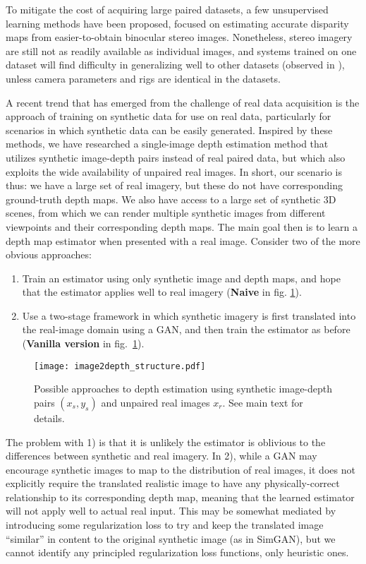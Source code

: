 \documentclass[runningheads]{llncs}
\begin{document}
To mitigate the cost of acquiring large paired datasets, a few unsupervised learning methods \cite{garg2016unsupervised,godard2017unsupervised,kuznietsov2017semi} have been proposed, focused on estimating accurate disparity maps from easier-to-obtain binocular stereo images. Nonetheless, stereo imagery are still not as readily available as individual images, and systems trained on one dataset will find difficulty in generalizing well to other datasets (observed in \cite{godard2017unsupervised}), unless camera parameters and rigs are identical in the datasets.

A recent trend that has emerged from the challenge of real data acquisition is the approach of training on synthetic data for use on real data\cite{qiu2016unrealcv,shrivastava2017learning,hoffman2017cycada}, particularly for scenarios in which synthetic data can be easily generated. Inspired by these methods, we have researched a single-image depth estimation method that utilizes synthetic image-depth pairs instead of real paired data, but which also exploits the wide availability of unpaired real images. In short, our scenario is thus: we have a large set of real imagery, but these do not have corresponding ground-truth depth maps. We also have access to a large set of synthetic 3D scenes, from which we can render multiple synthetic images from different viewpoints and their corresponding depth maps. The main goal then is to learn a depth map estimator when presented with a real image.
Consider two of the more obvious approaches:
\begin{enumerate}
	\item Train an estimator using only synthetic image and depth maps, and hope that the estimator applies well to real imagery ({\bf Naive} in fig. \ref{fig:structure}). 
	\item Use a two-stage framework in which synthetic imagery is first translated into the real-image domain using a GAN, and then train the estimator as before ({\bf Vanilla version} in fig.~\ref{fig:structure}).
\end{enumerate}
\begin{figure}[tb!]
	\centering
	\texttt{[image: image2depth\_structure.pdf]}
	
	\caption{Possible approaches to depth estimation using synthetic image-depth pairs $(x_s, y_s)$ and unpaired real images $x_r$. See main text for details.} 
	\label{fig:structure}
\end{figure}
The problem with 1) is that it is unlikely the estimator is oblivious to the differences between synthetic and real imagery. In 2), while a GAN may encourage synthetic images to map to the distribution of real images, it does not explicitly require the translated realistic image to have any physically-correct relationship to its corresponding depth map, meaning that the learned estimator will not apply well to actual real input. This may be somewhat mediated by introducing some regularization loss to try and keep the translated image ``similar'' in content to the original synthetic image (as in SimGAN\cite{shrivastava2017learning}), but we cannot identify any principled regularization loss functions, only heuristic ones.
\end{document}
